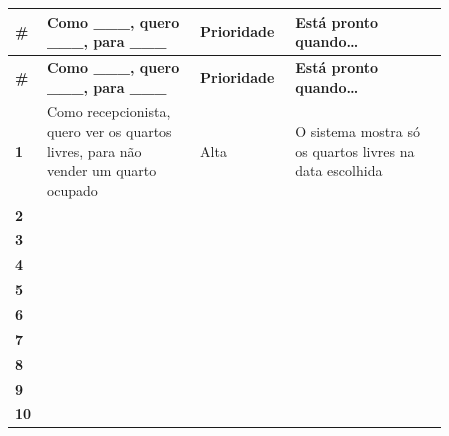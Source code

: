\documentclass[11pt,a4paper]{article}
\begin{document}
\begin{longtable}{>{\raggedright\arraybackslash}p{0.042\linewidth}>{\raggedright\arraybackslash}p{0.329\linewidth}>{\raggedright\arraybackslash}p{0.156\linewidth}>{\raggedright\arraybackslash}p{0.329\linewidth}}
\rowcolor{cor} \color{white}\textbf{\footnotesize \#} & \color{white}\textbf{\footnotesize Como \_\_\_, quero \_\_\_, para \_\_\_} & \color{white}\textbf{\footnotesize Prioridade} & \color{white}\textbf{\footnotesize Está pronto quando…} \\
\endfirsthead
\rowcolor{cor} \color{white}\textbf{\footnotesize \#} & \color{white}\textbf{\footnotesize Como \_\_\_, quero \_\_\_, para \_\_\_} & \color{white}\textbf{\footnotesize Prioridade} & \color{white}\textbf{\footnotesize Está pronto quando…} \\
\endhead
\rowcolor{white}\textbf{1} & Como recepcionista, quero ver os quartos livres, para não vender um quarto ocupado & Alta & O sistema mostra só os quartos livres na data escolhida \\ \hline
\rowcolor{suave!55}\rule{0pt}{24pt}\textbf{2} &  &  &  \\ \hline
\rowcolor{white}\rule{0pt}{24pt}\textbf{3} &  &  &  \\ \hline
\rowcolor{suave!55}\rule{0pt}{24pt}\textbf{4} &  &  &  \\ \hline
\rowcolor{white}\rule{0pt}{24pt}\textbf{5} &  &  &  \\ \hline
\rowcolor{suave!55}\rule{0pt}{24pt}\textbf{6} &  &  &  \\ \hline
\rowcolor{white}\rule{0pt}{24pt}\textbf{7} &  &  &  \\ \hline
\rowcolor{suave!55}\rule{0pt}{24pt}\textbf{8} &  &  &  \\ \hline
\rowcolor{white}\rule{0pt}{24pt}\textbf{9} &  &  &  \\ \hline
\rowcolor{suave!55}\rule{0pt}{24pt}\textbf{10} &  &  &  \\ \hline
\end{longtable}
\endgroup
\end{document}
